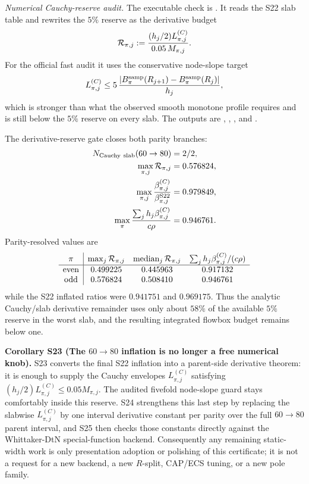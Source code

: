 \documentclass[aps,prd,onecolumn,notitlepage,nofootinbib,superscriptaddress,11pt,floatfix]{revtex4-2}
\begin{document}
\emph{Numerical Cauchy-reserve audit.}
The executable check is
.  It reads the
S22 slab table and rewrites the \(5\%\) reserve as the derivative budget
\[
{\cal R}_{\pi,j}:=
\frac{(h_j/2)L^{(C)}_{\pi,j}}{0.05\,M_{\pi,j}}.
\]
For the official fast audit it uses the conservative node-slope target
\[
L^{(C)}_{\pi,j}\le
5\,\frac{|B^{\rm samp}_\pi(R_{j+1})-B^{\rm samp}_\pi(R_j)|}{h_j},
\]
which is stronger than what the observed smooth monotone profile requires and
is still below the \(5\%\) reserve on every slab.  The outputs are
,
,
, and
.

The derivative-reserve gate closes both parity branches:
\[
\begin{aligned}
N_{\rm Cauchy\ slab}(60\to80)&=2/2,\\
\max_{\pi,j}{\cal R}_{\pi,j}&=0.576824,\\
\max_{\pi,j}\frac{\beta^{(C)}_{\pi,j}}{\beta^{\rm S22}_{\pi,j}}&=0.979849,\\
\max_{\pi}\frac{\sum_j h_j\beta^{(C)}_{\pi,j}}{c\rho}&=0.946761.
\end{aligned}
\]
Parity-resolved values are
\[
\begin{array}{c|ccc}
\pi & \max_j{\cal R}_{\pi,j} &
\operatorname{median}_j{\cal R}_{\pi,j} &
\sum_j h_j\beta^{(C)}_{\pi,j}/(c\rho)\\
\hline
{\rm even} & 0.499225 & 0.445963 & 0.917132\\
{\rm odd}  & 0.576824 & 0.508410 & 0.946761
\end{array}
\]
while the S22 inflated ratios were \(0.941751\) and \(0.969175\).  Thus the
analytic Cauchy/slab derivative remainder uses only about \(58\%\) of the
available \(5\%\) reserve in the worst slab, and the resulting integrated
flowbox budget remains below one.

\medskip\noindent\textbf{Corollary S23 (The \(60\to80\) inflation is no longer a free numerical knob).}
S23 converts the final S22 inflation into a parent-side derivative theorem:
it is enough to supply the Cauchy envelopes \(L^{(C)}_{\pi,j}\) satisfying
\((h_j/2)L^{(C)}_{\pi,j}\le0.05M_{\pi,j}\).  The audited fivefold node-slope
guard stays comfortably inside this reserve.  S24 strengthens this last step
by replacing the slabwise \(L^{(C)}_{\pi,j}\) by one interval derivative
constant per parity over the full \(60\to80\) parent interval, and S25 then
checks those constants directly against the Whittaker-DtN special-function
backend.  Consequently any remaining static-width work is only presentation
adoption or polishing of this certificate; it is not a request for a new
backend, a new \(R\)-split, CAP/ECS tuning, or a new pole family.
\end{document}

